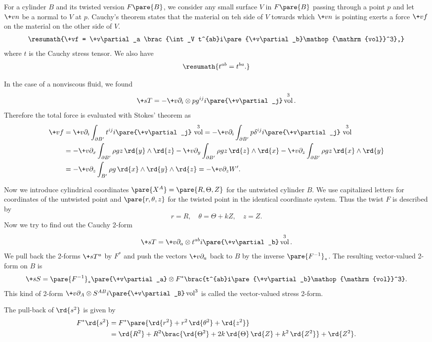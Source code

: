 \documentclass[hidelinks]{article}
\DeclareMathOperator{\vol}{vol}
\let\oldgloss\gloss
\def\gloss#1{\textbf{\oldgloss{#1}}}
\begin{document}
For a cylinder $B$ and its twisted version $F\pare{B}$, we consider any small surface $V$ in $F\pare{B}$ passing through a point $p$ and let $\+vn$ be a normal to $V$ at $p$. Cauchy's theorem states that the material on teh side of $V$ towards which $\+vn$ is pointing exerts a force $\+vf$ on the material on the other side of $V$.
\[ \resumath{\+vf = \+v\partial_a \brac{\int_V t^{ab}i\pare{\+v\partial_b}\vol^3},} \]
where $t$ is the Cauchy stress tensor. We also have
\[ \resumath{t^{ab} = t^{ba}.} \]
\par
In the case of a nonviscous fluid, we found
\[ \+sT = -\+v\partial_i \otimes pg^{ij}i\pare{\+v\partial_j}\vol^3. \]
Therefore the total force is evaluated with Stokes' theorem as
\begin{align*}
    \+vf &= \+v\partial_i \int_{\partial B'} t^{ij}i\pare{\+v\partial_j}\,\vol^3 = -\+v\partial_i \int_{\partial B'}p\delta^{ij}i\pare{\+v\partial_j}\,\vol^3 \\
    &= -\+v\partial_x \int_{\partial B'} \rho gz \,\rd{y}\wedge \rd{z} -\+v\partial_y \int_{\partial B'} \rho gz \,\rd{z}\wedge \rd{x} -\+v\partial_z \int_{\partial B'} \rho gz \,\rd{x}\wedge \rd{y} \\
    &= -\+v\partial_z \int_{B'}\rho g\,\rd{x}\wedge \rd{y}\wedge \rd{z} = -\+v\partial_z W'.
\end{align*}
\par
Now we introduce cylindrical coordinates $\pare{X^A} = \pare{R,\Theta,Z}$ for the untwisted cylinder $B$. We use capitalized letters for coordinates of the untwisted point and $\pare{r,\theta,z}$ for the twisted point in the identical coordinate system. Thus the twist $F$ is described by
\[ r=R,\quad \theta = \Theta + kZ,\quad z=Z. \]
Now we try to find out the Cauchy 2-form
\[ \+sT = \+v\partial_a \otimes t^{ab}i\pare{\+v\partial_b}\vol^3. \]
We pull back the 2-forms $\+sT^a$ by $F^*$ and push the vectors $\+v\partial_a$ back to $B$ by the inverse $\pare{F^{-1}}_*$. The resulting vector-valued 2-form on $B$ is
\[ \+sS = \pare{F^{-1}}_* \pare{\+v\partial_a} \otimes F^*\brac{t^{ab}i\pare{\+v\partial_b}\vol^3}. \]
This kind of 2-form $\+v\partial_A \otimes S^{AB}i\pare{\+v\partial_B}\vol^3$ is called the  vector-valued stress 2-form.
\par
The pull-back of $\rd{s^2}$ is given by
\begin{align*}
    F^*\rd{s^2} &= F^*\pare{\rd{r^2} + r^2\,\rd{\theta^2} + \rd{z^2}} \\
    &= \rd{R^2} + R^2\brac{\rd{\Theta^2} + 2k\,\rd{\Theta}\,\rd{Z} + k^2\,\rd{Z^2}} + \rd{Z^2}.
\end{align*}
\end{document}
